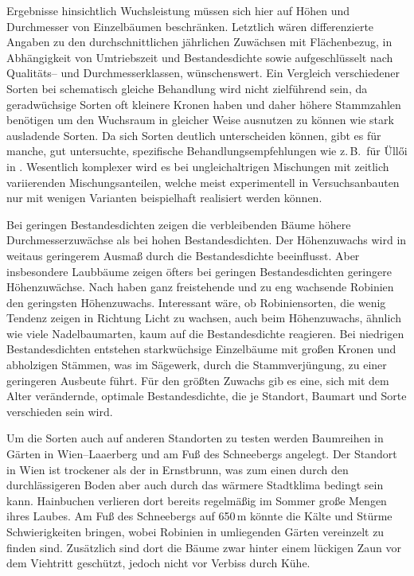 \documentclass[twocolumn]{scrartcl}
\begin{document}
Ergebnisse hinsichtlich Wuchsleistung müssen sich hier auf Höhen und
Durchmesser von Einzelbäumen beschränken.  Letztlich wären
differenzierte Angaben zu den durchschnittlichen jährlichen Zuwächsen
mit Flächenbezug, in Abhängigkeit von Umtriebszeit und Bestandesdichte
sowie aufgeschlüsselt nach Qualitäts-- und Durchmesserklassen,
wünschenswert.  Ein Vergleich verschiedener Sorten bei schematisch
gleiche Behandlung wird nicht zielführend sein, da geradwüchsige
Sorten oft kleinere Kronen haben \citep{bujtas1984robinie} und daher
höhere Stammzahlen benötigen \citep{keresztesi1974robinie} um den
Wuchsraum in gleicher Weise ausnutzen zu können wie stark ausladende
Sorten. Da sich Sorten deutlich unterscheiden können, gibt es für
manche, gut untersuchte, spezifische Behandlungsempfehlungen wie
z.\,B.\ für Üllői in \citet{redei2020ulloi}. Wesentlich komplexer wird
es bei ungleichaltrigen Mischungen mit zeitlich variierenden
Mischungsanteilen, welche meist experimentell in Versuchsanbauten nur
mit wenigen Varianten beispielhaft realisiert werden können.

Bei geringen Bestandesdichten zeigen die verbleibenden Bäume höhere
Durchmesserzuwächse als bei hohen Bestandesdichten. Der Höhenzuwachs
wird in weitaus geringerem Ausmaß durch die Bestandesdichte
beeinflusst. Aber insbesondere Laubbäume zeigen öfters bei geringen
Bestandesdichten geringere Höhenzuwächse.
Nach \citet[S.~55]{bluemke1955robinie} haben ganz freistehende und zu eng
wachsende Robinien den geringsten Höhenzuwachs.
Interessant wäre, ob
Robiniensorten, die wenig Tendenz zeigen in Richtung Licht zu wachsen,
auch beim Höhenzuwachs, ähnlich wie viele Nadelbaumarten, kaum auf die
Bestandesdichte reagieren. Bei niedrigen Bestandesdichten entstehen
starkwüchsige Einzelbäume mit großen Kronen und abholzigen Stämmen,
was im Sägewerk, durch die Stammverjüngung, zu einer geringeren
Ausbeute führt. Für den größten Zuwachs gib es eine, sich mit dem
Alter verändernde, optimale Bestandesdichte, die je Standort, Baumart
und Sorte verschieden sein wird.

Um die Sorten auch auf anderen Standorten zu testen werden Baumreihen in Gärten
in Wien--Laaerberg und am Fuß des Schneebergs angelegt. Der Standort in Wien ist
trockener als der in Ernstbrunn, was zum einen durch den durchlässigeren Boden
aber auch durch das wärmere Stadtklima bedingt sein kann. Hainbuchen verlieren
dort bereits regelmäßig im Sommer große Mengen ihres Laubes. Am Fuß des
Schneebergs auf 650\,m könnte die Kälte und Stürme Schwierigkeiten bringen,
wobei Robinien in umliegenden Gärten vereinzelt zu finden sind. Zusätzlich sind
dort die Bäume zwar hinter einem lückigen Zaun vor dem Viehtritt geschützt,
jedoch nicht vor Verbiss durch Kühe.
\end{document}
